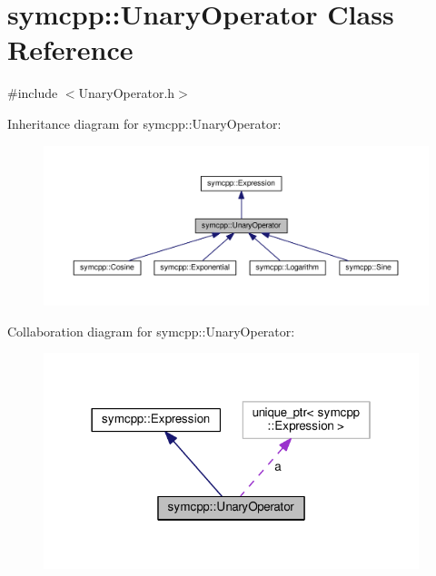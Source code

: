 \hypertarget{classsymcpp_1_1UnaryOperator}{}\section{symcpp\+:\+:Unary\+Operator Class Reference}
\label{classsymcpp_1_1UnaryOperator}


{\ttfamily \#include $<$Unary\+Operator.\+h$>$}



Inheritance diagram for symcpp\+:\+:Unary\+Operator\+:\nopagebreak
\begin{figure}[H]
\begin{center}
\leavevmode
\includegraphics[width=350pt]{classsymcpp_1_1UnaryOperator__inherit__graph}
\end{center}
\end{figure}


Collaboration diagram for symcpp\+:\+:Unary\+Operator\+:\nopagebreak
\begin{figure}[H]
\begin{center}
\leavevmode
\includegraphics[width=310pt]{classsymcpp_1_1UnaryOperator__coll__graph}
\end{center}
\end{figure}
